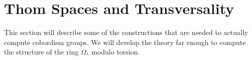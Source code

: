 \documentclass[../main]{subfiles}
\begin{document}
\chapter{Thom Spaces and Transversality}\label{ch:18}
This section will describe some of the constructions that are needed to actually compute cobordism groups. We will develop the theory far enough to compute the structure of the ring $\Omega_\ast$ modulo torsion. 





\end{document}
